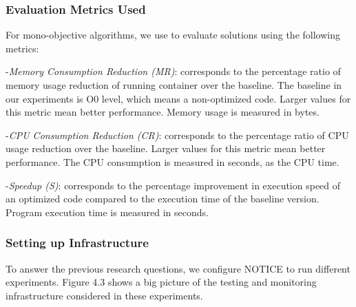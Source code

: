 \subsubsection{Evaluation Metrics Used}

For mono-objective algorithms, we use to evaluate solutions using the following metrics:

-\textit{Memory Consumption Reduction (MR)}: corresponds to the percentage ratio of memory usage reduction of running container over the baseline. The baseline in our experiments is O0 level, which means a non-optimized code. Larger values for this metric mean better performance. Memory usage is measured in bytes.

-\textit{CPU Consumption Reduction (CR)}: corresponds to the percentage ratio of CPU usage reduction over the baseline. Larger values for this metric mean better performance. The CPU consumption is measured in seconds, as the CPU time.

-\textit{Speedup (S)}: corresponds to the percentage improvement in execution speed of an optimized code compared to the execution time of the baseline version. Program execution time is measured in seconds.




\subsubsection{Setting up Infrastructure}
To answer the previous research questions, we configure NOTICE to run different experiments. Figure 4.3 shows a big picture of the testing and monitoring infrastructure considered in these experiments. 

